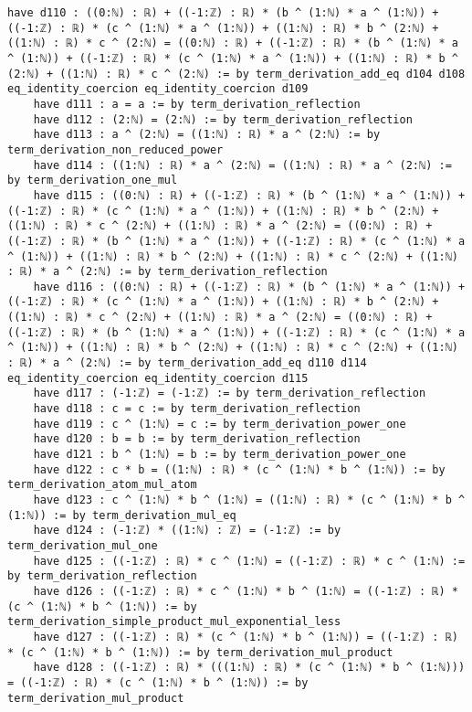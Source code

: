 \documentclass{article}
\begin{document}
\begin{tcolorbox}[colback=white!10, width=\linewidth]
\begin{lstlisting}[language=Lean4]
    have d110 : ((0:ℕ) : ℝ) + ((-1:ℤ) : ℝ) * (b ^ (1:ℕ) * a ^ (1:ℕ)) + ((-1:ℤ) : ℝ) * (c ^ (1:ℕ) * a ^ (1:ℕ)) + ((1:ℕ) : ℝ) * b ^ (2:ℕ) + ((1:ℕ) : ℝ) * c ^ (2:ℕ) = ((0:ℕ) : ℝ) + ((-1:ℤ) : ℝ) * (b ^ (1:ℕ) * a ^ (1:ℕ)) + ((-1:ℤ) : ℝ) * (c ^ (1:ℕ) * a ^ (1:ℕ)) + ((1:ℕ) : ℝ) * b ^ (2:ℕ) + ((1:ℕ) : ℝ) * c ^ (2:ℕ) := by term_derivation_add_eq d104 d108 eq_identity_coercion eq_identity_coercion d109
    have d111 : a = a := by term_derivation_reflection
    have d112 : (2:ℕ) = (2:ℕ) := by term_derivation_reflection
    have d113 : a ^ (2:ℕ) = ((1:ℕ) : ℝ) * a ^ (2:ℕ) := by term_derivation_non_reduced_power
    have d114 : ((1:ℕ) : ℝ) * a ^ (2:ℕ) = ((1:ℕ) : ℝ) * a ^ (2:ℕ) := by term_derivation_one_mul
    have d115 : ((0:ℕ) : ℝ) + ((-1:ℤ) : ℝ) * (b ^ (1:ℕ) * a ^ (1:ℕ)) + ((-1:ℤ) : ℝ) * (c ^ (1:ℕ) * a ^ (1:ℕ)) + ((1:ℕ) : ℝ) * b ^ (2:ℕ) + ((1:ℕ) : ℝ) * c ^ (2:ℕ) + ((1:ℕ) : ℝ) * a ^ (2:ℕ) = ((0:ℕ) : ℝ) + ((-1:ℤ) : ℝ) * (b ^ (1:ℕ) * a ^ (1:ℕ)) + ((-1:ℤ) : ℝ) * (c ^ (1:ℕ) * a ^ (1:ℕ)) + ((1:ℕ) : ℝ) * b ^ (2:ℕ) + ((1:ℕ) : ℝ) * c ^ (2:ℕ) + ((1:ℕ) : ℝ) * a ^ (2:ℕ) := by term_derivation_reflection
    have d116 : ((0:ℕ) : ℝ) + ((-1:ℤ) : ℝ) * (b ^ (1:ℕ) * a ^ (1:ℕ)) + ((-1:ℤ) : ℝ) * (c ^ (1:ℕ) * a ^ (1:ℕ)) + ((1:ℕ) : ℝ) * b ^ (2:ℕ) + ((1:ℕ) : ℝ) * c ^ (2:ℕ) + ((1:ℕ) : ℝ) * a ^ (2:ℕ) = ((0:ℕ) : ℝ) + ((-1:ℤ) : ℝ) * (b ^ (1:ℕ) * a ^ (1:ℕ)) + ((-1:ℤ) : ℝ) * (c ^ (1:ℕ) * a ^ (1:ℕ)) + ((1:ℕ) : ℝ) * b ^ (2:ℕ) + ((1:ℕ) : ℝ) * c ^ (2:ℕ) + ((1:ℕ) : ℝ) * a ^ (2:ℕ) := by term_derivation_add_eq d110 d114 eq_identity_coercion eq_identity_coercion d115
    have d117 : (-1:ℤ) = (-1:ℤ) := by term_derivation_reflection
    have d118 : c = c := by term_derivation_reflection
    have d119 : c ^ (1:ℕ) = c := by term_derivation_power_one
    have d120 : b = b := by term_derivation_reflection
    have d121 : b ^ (1:ℕ) = b := by term_derivation_power_one
    have d122 : c * b = ((1:ℕ) : ℝ) * (c ^ (1:ℕ) * b ^ (1:ℕ)) := by term_derivation_atom_mul_atom
    have d123 : c ^ (1:ℕ) * b ^ (1:ℕ) = ((1:ℕ) : ℝ) * (c ^ (1:ℕ) * b ^ (1:ℕ)) := by term_derivation_mul_eq
    have d124 : (-1:ℤ) * ((1:ℕ) : ℤ) = (-1:ℤ) := by term_derivation_mul_one
    have d125 : ((-1:ℤ) : ℝ) * c ^ (1:ℕ) = ((-1:ℤ) : ℝ) * c ^ (1:ℕ) := by term_derivation_reflection
    have d126 : ((-1:ℤ) : ℝ) * c ^ (1:ℕ) * b ^ (1:ℕ) = ((-1:ℤ) : ℝ) * (c ^ (1:ℕ) * b ^ (1:ℕ)) := by term_derivation_simple_product_mul_exponential_less
    have d127 : ((-1:ℤ) : ℝ) * (c ^ (1:ℕ) * b ^ (1:ℕ)) = ((-1:ℤ) : ℝ) * (c ^ (1:ℕ) * b ^ (1:ℕ)) := by term_derivation_mul_product
    have d128 : ((-1:ℤ) : ℝ) * (((1:ℕ) : ℝ) * (c ^ (1:ℕ) * b ^ (1:ℕ))) = ((-1:ℤ) : ℝ) * (c ^ (1:ℕ) * b ^ (1:ℕ)) := by term_derivation_mul_product

\end{lstlisting}
\end{tcolorbox}
\end{document}
